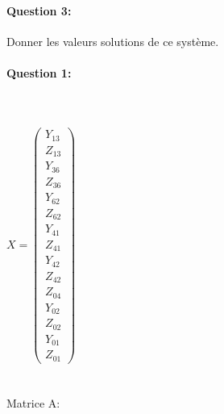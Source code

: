 \paragraph{Question 3:} Donner les valeurs solutions de ce système.

\ifdef{\public}{}

\newpage

\pagestyle{correction}\setcounter{section}{0}

\paragraph{Question 1:}
 ~\ \\ ~\ \\
$X=\left(\begin{array}{c}
Y_{13} \\ Z_{13} \\ Y_{36} \\ Z_{36} \\ Y_{62} \\ Z_{62} \\
Y_{41} \\ Z_{41} \\ Y_{42} \\ Z_{42} \\ Z_{04} \\ Y_{02} \\
Z_{02} \\ Y_{01} \\ Z_{01}\end{array}\right)$
\\ ~\ \\ ~\ \\
Matrice A:\\ ~\ \\
